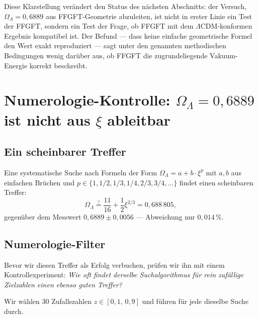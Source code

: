 Diese Klarstellung verändert den Status des nächsten Abschnitts: der Versuch, \(\Omega_\Lambda = 0{,}6889\) aus FFGFT-Geometrie abzuleiten, ist nicht in erster Linie ein Test der FFGFT, sondern ein Test der Frage, ob FFGFT mit dem \(\Lambda\)CDM-konformen Ergebnis kompatibel ist. Der Befund — dass keine einfache geometrische Formel den Wert exakt reproduziert — sagt unter den genannten methodischen Bedingungen wenig darüber aus, ob FFGFT die zugrundeliegende Vakuum-Energie korrekt beschreibt.

\section[Numerologie-Kontrolle: Omega-Lambda nicht aus xi ableitbar]{Numerologie-Kontrolle: \(\Omega_\Lambda = 0{,}6889\) ist nicht aus \(\xi\) ableitbar}
\label{sec:numerologie}

\subsection{Ein scheinbarer Treffer}

Eine systematische Suche nach Formeln der Form \(\Omega_\Lambda = a + b \cdot \xi^p\) mit \(a, b\) aus einfachen Brüchen und \(p \in \{1, 1/2, 1/3, 1/4, 2/3, 3/4, \dots\}\) findet einen scheinbaren Treffer:
\begin{equation}
\Omega_\Lambda \stackrel{?}{=} \frac{11}{16} + \frac{1}{2} \xi^{2/3} = 0{,}688\,805,
\end{equation}
gegenüber dem Messwert \(0{,}6889 \pm 0{,}0056\) — Abweichung nur \(0{,}014\,\%\).

\subsection{Numerologie-Filter}

Bevor wir diesen Treffer als Erfolg verbuchen, prüfen wir ihn mit einem Kontrollexperiment: \emph{Wie oft findet derselbe Suchalgorithmus für rein zufällige Zielzahlen einen ebenso guten Treffer?}

Wir wählen 30 Zufallszahlen \(z \in [0{,}1,\, 0{,}9]\) und führen für jede dieselbe Suche durch.

\begin{table}[h]
\centering
\caption{Numerologie-Filter: Verteilung der zufälligen ``Treffer''}
\end{table}

